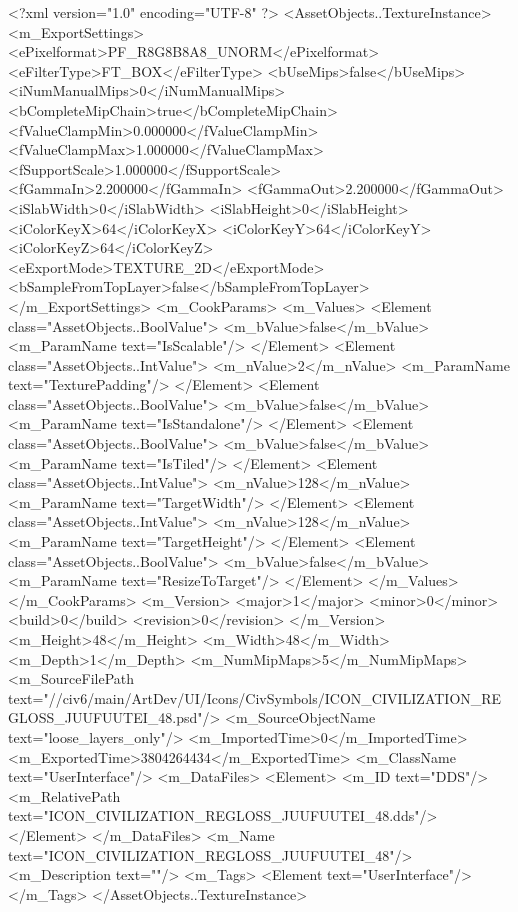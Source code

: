 <?xml version="1.0" encoding="UTF-8" ?>
<AssetObjects..TextureInstance>
	<m_ExportSettings>
		<ePixelformat>PF_R8G8B8A8_UNORM</ePixelformat>
		<eFilterType>FT_BOX</eFilterType>
		<bUseMips>false</bUseMips>
		<iNumManualMips>0</iNumManualMips>
		<bCompleteMipChain>true</bCompleteMipChain>
		<fValueClampMin>0.000000</fValueClampMin>
		<fValueClampMax>1.000000</fValueClampMax>
		<fSupportScale>1.000000</fSupportScale>
		<fGammaIn>2.200000</fGammaIn>
		<fGammaOut>2.200000</fGammaOut>
		<iSlabWidth>0</iSlabWidth>
		<iSlabHeight>0</iSlabHeight>
		<iColorKeyX>64</iColorKeyX>
		<iColorKeyY>64</iColorKeyY>
		<iColorKeyZ>64</iColorKeyZ>
		<eExportMode>TEXTURE_2D</eExportMode>
		<bSampleFromTopLayer>false</bSampleFromTopLayer>
	</m_ExportSettings>
	<m_CookParams>
		<m_Values>
			<Element class="AssetObjects..BoolValue">
				<m_bValue>false</m_bValue>
				<m_ParamName text="IsScalable"/>
			</Element>
			<Element class="AssetObjects..IntValue">
				<m_nValue>2</m_nValue>
				<m_ParamName text="TexturePadding"/>
			</Element>
			<Element class="AssetObjects..BoolValue">
				<m_bValue>false</m_bValue>
				<m_ParamName text="IsStandalone"/>
			</Element>
			<Element class="AssetObjects..BoolValue">
				<m_bValue>false</m_bValue>
				<m_ParamName text="IsTiled"/>
			</Element>
			<Element class="AssetObjects..IntValue">
				<m_nValue>128</m_nValue>
				<m_ParamName text="TargetWidth"/>
			</Element>
			<Element class="AssetObjects..IntValue">
				<m_nValue>128</m_nValue>
				<m_ParamName text="TargetHeight"/>
			</Element>
			<Element class="AssetObjects..BoolValue">
				<m_bValue>false</m_bValue>
				<m_ParamName text="ResizeToTarget"/>
			</Element>
		</m_Values>
	</m_CookParams>
	<m_Version>
		<major>1</major>
		<minor>0</minor>
		<build>0</build>
		<revision>0</revision>
	</m_Version>
	<m_Height>48</m_Height>
	<m_Width>48</m_Width>
	<m_Depth>1</m_Depth>
	<m_NumMipMaps>5</m_NumMipMaps>
	<m_SourceFilePath text="//civ6/main/ArtDev/UI/Icons/CivSymbols/ICON_CIVILIZATION_REGLOSS_JUUFUUTEI_48.psd"/>
	<m_SourceObjectName text="loose_layers_only"/>
	<m_ImportedTime>0</m_ImportedTime>
	<m_ExportedTime>3804264434</m_ExportedTime>
	<m_ClassName text="UserInterface"/>
	<m_DataFiles>
		<Element>
			<m_ID text="DDS"/>
			<m_RelativePath text="ICON_CIVILIZATION_REGLOSS_JUUFUUTEI_48.dds"/>
		</Element>
	</m_DataFiles>
	<m_Name text="ICON_CIVILIZATION_REGLOSS_JUUFUUTEI_48"/>
	<m_Description text=""/>
	<m_Tags>
		<Element text="UserInterface"/>
	</m_Tags>
</AssetObjects..TextureInstance>

